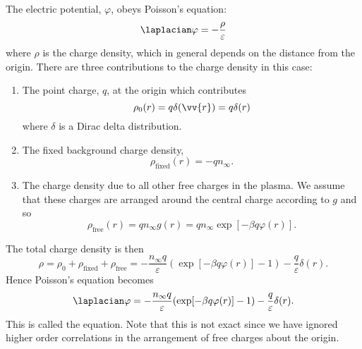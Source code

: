 \documentclass[fleqn]{NotesClass}
\begin{document}
    The electric potential, \(\varphi\), obeys Poisson's equation:
    \begin{equation}
        \laplacian \varphi = -\frac{\rho}{\varepsilon}
    \end{equation}
    where \(\rho\) is the charge density, which in general depends on the distance from the origin.
    There are three contributions to the charge density in this case:
    \begin{enumerate}
        \item The point charge, \(q\), at the origin which contributes
        \begin{equation}
            \rho_0(r) = q\delta(\vv{r}) = q\delta(r)
        \end{equation}
        where \(\delta\) is a Dirac delta distribution.
        \item The fixed background charge density,
        \begin{equation}
            \rho_{\mathrm{fixed}}(r) = -qn_{\infty}.
        \end{equation}
        \item The charge density due to all other free charges in the plasma.
        We assume that these charges are arranged around the central charge according to \(g\) and so
        \begin{equation}
            \rho_{\mathrm{free}}(r) = qn_{\infty}g(r) = qn_{\infty} \exp[-\beta q\varphi(r)].
        \end{equation}
    \end{enumerate}
    The total charge density is then
    \begin{equation}
        \rho = \rho_0 + \rho_{\mathrm{fixed}} + \rho_{\mathrm{free}} = -\frac{n_{\infty}q}{\varepsilon}(\exp[-\beta q\varphi(r)] - 1) - \frac{q}{\varepsilon}\delta(r).
    \end{equation}
    Hence Poisson's equation becomes
    \begin{equation}
        \laplacian\varphi = -\frac{n_{\infty}q}{\varepsilon}(\exp[-\beta q\varphi(r)] - 1) - \frac{q}{\varepsilon}\delta(r).
    \end{equation}
    This is called the  equation.
    Note that this is not exact since we have ignored higher order correlations in the arrangement of free charges about the origin.
    
\end{document}

